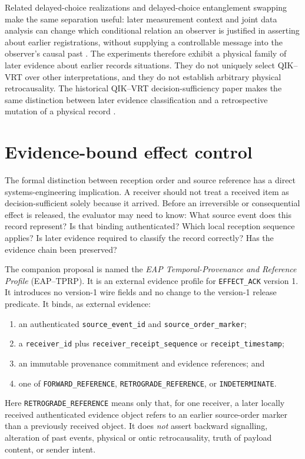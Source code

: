 \documentclass[11pt]{article}
\theoremstyle{remark}
\begin{document}
Related delayed-choice realizations and delayed-choice entanglement swapping
make the same separation useful: later measurement context and joint data
analysis can change which conditional relation an observer is justified in
asserting about earlier registrations, without supplying a controllable
message into the observer's causal past \cite{Jacques2007,Ma2012,Ma2013}.
The experiments therefore exhibit a physical family of later evidence about
earlier records situations. They do not uniquely select QIK--VRT over other
interpretations, and they do not establish arbitrary physical retrocausality.
The historical QIK--VRT decision-sufficiency paper makes the same distinction
between later evidence classification and a retrospective mutation of a
physical record \cite{LohmannDecisionSufficiency2026}.

\section{Evidence-bound effect control}
\label{sec:eap}

The formal distinction between reception order and source reference has a
direct systems-engineering implication. A receiver should not treat a
received item as decision-sufficient solely because it arrived. Before an
irreversible or consequential effect is released, the evaluator may need to
know: What source event does this record represent? Is that binding
authenticated? Which local reception sequence applies? Is later evidence
required to classify the record correctly? Has the evidence chain been
preserved?

The companion proposal is named the \emph{EAP Temporal-Provenance and
Reference Profile} (EAP--TPRP). It is an external evidence profile for
\texttt{EFFECT\_ACK} version 1. It introduces no version-1 wire fields and no
change to the version-1 release predicate. It binds, as external evidence:
\begin{enumerate}
  \item an authenticated \texttt{source\_event\_id} and
  \texttt{source\_order\_marker};
  \item a \texttt{receiver\_id} plus
  \texttt{receiver\_receipt\_sequence} or \texttt{receipt\_timestamp};
  \item an immutable provenance commitment and evidence references; and
  \item one of \texttt{FORWARD\_REFERENCE},
  \texttt{RETROGRADE\_REFERENCE}, or \texttt{INDETERMINATE}.
\end{enumerate}
Here \texttt{RETROGRADE\_REFERENCE} means only that, for one receiver, a
later locally received authenticated evidence object refers to an earlier
source-order marker than a previously received object. It does \emph{not}
assert backward signalling, alteration of past events, physical or ontic
retrocausality, truth of payload content, or sender intent.
\end{document}
